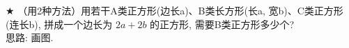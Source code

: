 \item {
    $\bigstar$
    （用2种方法）用若干A类正方形(边长a)、B类长方形(长a, 宽b)、C类正方形(连长b), 拼成一个边长为 $2a + 2b$ 的正方形, 需要B类正方形多少个? 
    \ifshowSolution
        \fangsong{}
        \\
        思路: 画图. 
    \else
        \\ \\ \\ \\ \\ \\ \\ \\
    \fi
}

\begin{comment}
\item {
    观察``杨辉三角'', 计算 $(a+b)^5$ 的结果中, 项 $a^3b^2$的系数, 
    \[
    \begin{matrix}
        & & & & 1 & & & \\
        & & & 1 & & 1 & & \\
        & & 1 & & 2 & & 1 & \\
        & 1 & & 3 & & 3 & & 1 \\
        1 & & 4 & & 6 & & 4 & & 1
    \end{matrix}
    \]
    \begin{align*}
        (a+b)^1 &= a+b \\
        (a+b)^2 &= a^2 + 2ab + b^2 \\
        (a+b)^3 &= a^3 + 3a^2b + 3ab^2 + b^3 \\
        (a+b)^4 &= a^4 + 4a^3b + 6a^2b^2 + 4ab^3 + b^4 \\
    \end{align*}
    \ifshowSolution
        \fangsong\zihao{4}
        \\
    \else
        \\ \\ \\
    \fi
}
\end{comment}

\begin{comment}
\item {
    判断 $49^8 - 14^2\times 7^{12}$ 能否被9整除, 并说明理由. 
    \ifshowSolution
        \fangsong\zihao{4}
        \\
    \else
        \\ \\ \\
    \fi
}
\end{comment}

